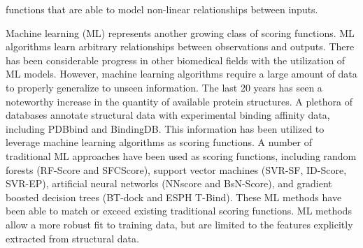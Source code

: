 \documentclass[journal=jcisd8,manuscript=article]{achemso}
\begin{document}
functions that are able to model non-linear relationships between inputs.

Machine learning (ML) represents another growing class of scoring functions. ML algorithms learn arbitrary relationships between observations and outputs. There has been considerable progress in other biomedical fields with the utilization of ML models\cite{zitnik2019machine}. However, machine learning algorithms require a large amount of data to properly generalize to unseen information. The last 20 years has seen a noteworthy increase in the quantity of available protein structures\cite{berman2000protein}. A plethora of databases annotate structural data with experimental binding affinity data, including PDBbind and BindingDB\cite{wang2004pdbbind,liu2017forging,gilson2016bindingdb}. This information has been utilized to leverage machine learning algorithms as scoring functions. A number of traditional ML approaches have been used as scoring functions, including random forests (RF-Score\cite{ballester2010machine} and SFCScore\cite{zilian2013sfcscore}), support vector machines (SVR-SF\cite{li2011svr}, ID-Score\cite{li2013idscore}, SVR-EP), artificial neural networks (NNscore\cite{durrant2010nnscore} and BsN-Score\cite{ashtawy2015bsn}), and gradient boosted decision trees (BT-dock\cite{btdock} and ESPH T-Bind\cite{cang2018integration}). These ML methods have been able to match or exceed existing traditional scoring functions. ML methods allow a more robust fit to training data, but are limited to the features explicitly extracted from structural data.
\end{document}
